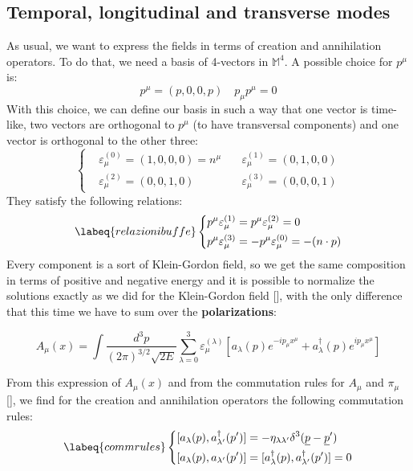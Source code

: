 \documentclass[../main.tex]{subfiles}
\begin{document}
\subsection{Temporal, longitudinal and transverse modes}
As usual, we want to express the fields in terms of creation and annihilation operators. To do that, we need a basis of 4-vectors in $\mathbb{M}^4$. A possible choice for $p^\mu$ is:
\[
p^\mu=(p,0,0,p) \quad p_\mu p^\mu=0
\]
With this choice, we can define our basis in such a way that one vector is time-like, two vectors are orthogonal to $p^\mu$ (to have transversal components) and one vector is orthogonal to the other three:
\[
\left\{
\begin{aligned}
&\varepsilon_\mu^{(0)}=(1,0,0,0)=n^\mu \quad &\varepsilon_\mu^{(1)}=(0,1,0,0)\\
&\varepsilon_\mu^{(2)}=(0,0,1,0) &\varepsilon_\mu^{(3)}=(0,0,0,1)
\end{aligned}
\right.
\]
They satisfy the following relations:
\begin{equation}
\labeq{relazionibuffe}
\left\{
\begin{aligned}
p^\mu\varepsilon_\mu^{(1)}&=p^\mu\varepsilon_\mu^{(2)}=0\\
p^\mu\varepsilon_\mu^{(3)}&=-p^\mu\varepsilon_\mu^{(0)}=-(n \cdot p)
\end{aligned}
\right.
\end{equation}
Every component is a sort of Klein-Gordon field, so we get the same composition in terms of positive and negative energy and it is possible to normalize the solutions exactly as we did for the Klein-Gordon field [], with the only difference that this time we have to sum over the \textbf{polarizations}:
\begin{kaobox}[frametitle=Electromagnetic field]
\[
A_\mu(x)=\int\frac{d^3p}{(2\pi)^{3/2}\sqrt{2E}}\sum_{\lambda=0}^3\varepsilon_\mu^{(\lambda)}\left[a_\lambda(p)e^{-ip_\mu x^\mu}+a^\dagger_\lambda(p)e^{ip_\mu x^\mu}\right]
\]
\end{kaobox}
From this expression of $A_\mu(x)$ and from the commutation rules for $A_\mu$ and $\pi_\mu$ [], we find for the creation and annihilation operators the following commutation rules:
\begin{equation}
\labeq{commrules}
\left\{
\begin{aligned}
[a_\lambda(p),a^\dagger_{\lambda'}(p')]&=-\eta_{\lambda\lambda'}\delta^3(\underline{p}-\underline{p}')\\
[a_\lambda(p),a_{\lambda'}(p')]&=[a^\dagger_\lambda(p),a^\dagger_{\lambda'}(p')]=0
\end{aligned}
\right.
\end{equation}
\end{document}
